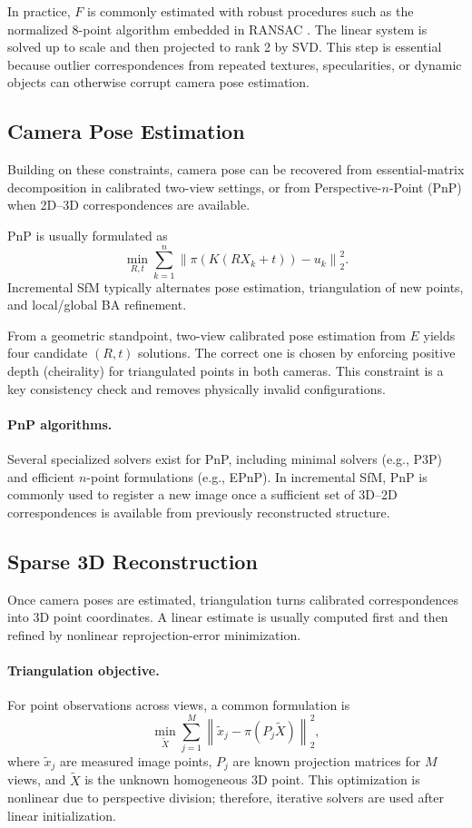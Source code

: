 In practice, $F$ is commonly estimated with robust procedures such as the normalized 8-point algorithm embedded in RANSAC \cite{fischler1981ransac}. The linear system is solved up to scale and then projected to rank 2 by SVD. This step is essential because outlier correspondences from repeated textures, specularities, or dynamic objects can otherwise corrupt camera pose estimation.

\subsection{Camera Pose Estimation}
Building on these constraints, camera pose can be recovered from essential-matrix decomposition in calibrated two-view settings, or from Perspective-$n$-Point (PnP) when 2D--3D correspondences are available.

PnP is usually formulated as
\[
\min_{R,t} \sum_{k=1}^{n}\left\|\pi\!\left(K(RX_k+t)\right)-u_k\right\|_2^2.
\]
Incremental SfM typically alternates pose estimation, triangulation of new points, and local/global BA refinement.

From a geometric standpoint, two-view calibrated pose estimation from $E$ yields four candidate $(R,t)$ solutions. The correct one is chosen by enforcing positive depth (cheirality) for triangulated points in both cameras. This constraint is a key consistency check and removes physically invalid configurations.

\paragraph{PnP algorithms.}
Several specialized solvers exist for PnP, including minimal solvers (e.g., P3P) and efficient $n$-point formulations (e.g., EPnP). In incremental SfM, PnP is commonly used to register a new image once a sufficient set of 3D--2D correspondences is available from previously reconstructed structure.

\subsection{Sparse 3D Reconstruction}
Once camera poses are estimated, triangulation turns calibrated correspondences into 3D point coordinates. A linear estimate is usually computed first and then refined by nonlinear reprojection-error minimization.

\paragraph{Triangulation objective.}
For point observations across views, a common formulation is
\[
\min_{\tilde{X}} \sum_{j=1}^{M} \left\| \tilde{x}_j-\pi(P_j\tilde{X}) \right\|_2^2,
\]
where $\tilde{x}_j$ are measured image points, $P_j$ are known projection matrices for $M$ views, and $\tilde{X}$ is the unknown homogeneous 3D point.
This optimization is nonlinear due to perspective division; therefore, iterative solvers are used after linear initialization.

